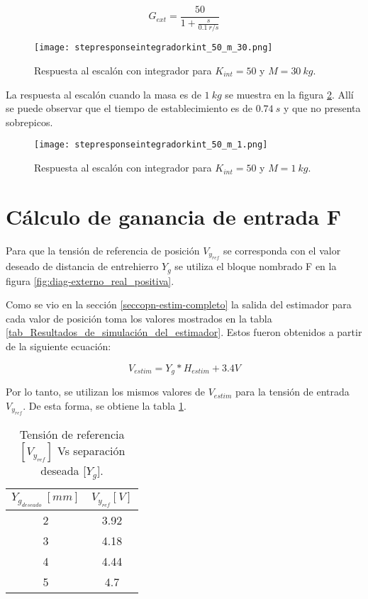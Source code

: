 \begin{equation} \label{eq_gexterno}
	G_{ext}=\frac{50}{1+\frac{s}{0.1\:r/s}}	
\end{equation}

\begin{figure}[H]
	\centering
	\texttt{[image: stepresponseintegradorkint\_50\_m\_30.png]}
	\caption{Respuesta al escalón con integrador para $K_{int}=50$ y $M = 30\:kg$.}
	\label{fig:respuesta-al-escalon-con-k-50-M-30}
\end{figure}

\noindent La respuesta al escal\'{o}n cuando la masa es de $1 \:kg$ se muestra en la figura \ref{fig:respuesta-al-escalon-con-k-50-M-1}. All\'{i} se puede observar que el tiempo de establecimiento es de $0.74\:s$ y que no presenta sobrepicos.

\begin{figure}[H]
	\centering
	\texttt{[image: stepresponseintegradorkint\_50\_m\_1.png]}
	\caption{Respuesta al escalón con integrador para $K_{int} =50$ y $M = 1 \:kg$.}
	\label{fig:respuesta-al-escalon-con-k-50-M-1}
\end{figure}


\section{Cálculo de ganancia de entrada F} \label{sec_calculo_F}

Para que la tensión de referencia de posición $V_{y_{ref}}$ se corresponda con el valor deseado de distancia de entrehierro $Y_g$ se utiliza el bloque nombrado F en la figura \ref{fig:diag-externo_real_positiva}. 

Como se vio en la sección \ref{seccopn-estim-completo} la salida del estimador para cada valor de posición toma los  valores mostrados en la tabla \ref{tab_Resultados_de_simulación_del_estimador}. Estos fueron obtenidos a partir de la siguiente ecuación:

\begin{equation}
	V_{estim}=Y_g*H_{estim}+3.4V
\end{equation}


Por lo tanto, se utilizan los mismos valores de $V_{estim}$ para la tensión de entrada $V_{y_{ref}}$. De esta forma, se obtiene la tabla \ref{tension-ref-vs-separacion-deseada}.

\begin{table}[H]
	\begin{center}
		\begin{tabular}{| c | c |}
			\hline
			$Y_{g_{deseado}}\:[mm]$ & $V_{y_{ref}}[V]$\\ \hline
			2 &	3.92 \\ \hline
			3 & 4.18\\ \hline
			4 & 4.44 \\ \hline
			5 & 4.7\\ \hline
		\end{tabular}
		\caption{Tensión de referencia $[V_{y_{ref}}]$ Vs separación deseada [$Y_g$].}
		\label{tension-ref-vs-separacion-deseada}
	\end{center}
\end{table}

